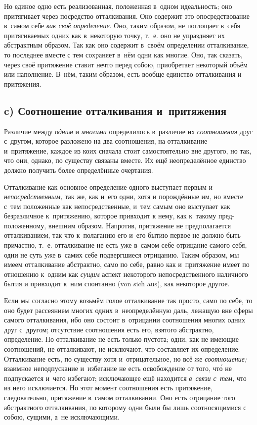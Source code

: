 Но единое одно есть реализованная, положенная в~одном идеальность; оно
притягивает через посредство отталкивания. Оно содержит это
опосредствование в~самом себе {\em как своё
определение}. Оно, таким образом, не поглощает в~себя притягиваемых одних
как в~некоторую точку, т.~е. оно не упраздняет их абстрактным образом. Так
как оно содержит в~своём определении отталкивание, то последнее вместе с
тем сохраняет в~нём одни как многие. Оно, так сказать, через своё
притяжение ставит нечто перед собою, приобретает некоторый объём или
наполнение. В~нём, таким образом, есть вообще единство отталкивания и
притяжения.

\subsection[c) Соотношение отталкивания и~притяжения]%
{c) Соотношение отталкивания и~притяжения}

Различие между {\em одним} и {\em многими} определилось в~различие их
{\em соотношения} друг с~другом, которое разложено на два соотношения, на
отталкивание и~притяжение, каждое из коих сначала стоит самостоятельно вне
другого, но так, что они, однако, по существу связаны вместе. Их ещё
неопределённое единство должно получить более определённые очертания.

Отталкивание как основное определение одного выступает первым и
{\em непосредственным,} так же, как и~его одни, хотя и
порождённые им, но вместе с~тем положенные как непосредственные, и~тем
самым оно выступает как безразличное к~притяжению, которое привходит к
нему, как к~такому пред-положенному, внешним образом. Напротив, притяжение
не предполагается отталкиванием, так что к~полаганию его и~его бытию первое
не должно быть причастно, т.~е. отталкивание не есть уже в~самом себе
отрицание самого себя, одни не суть уже в~самих себе подвергшиеся
отрицанию. Таким образом, мы имеем отталкивание абстрактно, само по себе,
равно как и~притяжение имеет по отношению к~одним как
{\em сущим} аспект некоторого непосредственного наличного бытия и
привходит к~ним спонтанно (von sich aus), как некоторое другое.

Если мы согласно этому возьмём голое отталкивание так просто, само по себе,
то оно будет рассеянием многих одних в~неопределённую даль, лежащую вне
сферы самого отталкивания, ибо оно состоит в~отрицании соотношения многих
одних друг с~другом; отсутствие соотношения есть его, взятого абстрактно,
определение. Но отталкивание не есть только пустота; одни, как не имеющие
соотношений, не отталкивают, не исключают, что составляет их определение.
Отталкивание есть, по существу хотя и~отрицательное, но всё же
{\em соотношение;} взаимное неподпускание и~избегание
не есть освобождение от того, чт\'{о} не подпускается и~чего избегают;
исключающее ещё находится {\em в~связи с~тем,} что из
него исключается. Но этот момент соотношения есть притяжение,
следовательно, притяжение в~самом отталкивании. Оно есть отрицание того
абстрактного отталкивания, по которому одни были бы лишь соотносящимися с
собою, сущими, а~не исключающими.

